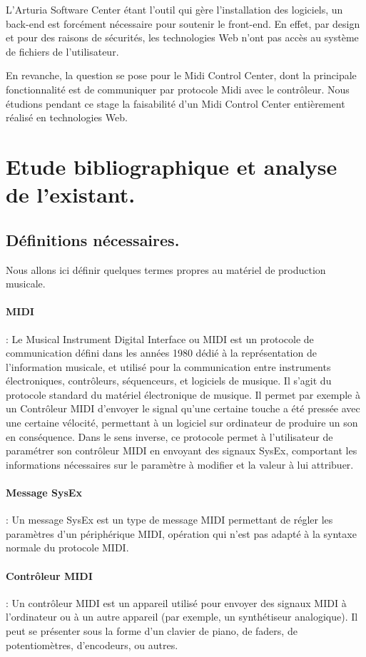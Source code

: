 \documentclass[francais]{rapportPFE}  %
\begin{document}
L'Arturia Software Center étant l'outil qui gère l'installation des logiciels, un back-end est forcément nécessaire pour soutenir le front-end. En effet, par design et pour des raisons de sécurités, les technologies Web n'ont pas accès au système de fichiers de l'utilisateur.

En revanche, la question se pose pour le Midi Control Center, dont la principale fonctionnalité est de communiquer par protocole Midi avec le contrôleur. Nous étudions pendant ce stage la faisabilité d'un Midi Control Center entièrement réalisé en technologies Web.

\section{Etude bibliographique et analyse de l'existant.}


\subsection{Définitions nécessaires.}

Nous allons ici définir quelques termes propres au matériel de production musicale.
\paragraph{MIDI} \cite{midi}
: Le Musical Instrument Digital Interface ou MIDI est un protocole de communication défini dans les années 1980 dédié à la représentation de l'information musicale, et utilisé pour la communication entre instruments électroniques, contrôleurs, séquenceurs, et logiciels de musique. Il s'agit du protocole standard du matériel électronique de musique. Il permet par exemple à un Contrôleur MIDI d'envoyer le signal qu'une certaine touche a été pressée avec une certaine vélocité, permettant à un logiciel sur ordinateur de produire un son en conséquence. Dans le sens inverse, ce protocole permet à l'utilisateur de paramétrer son contrôleur MIDI en envoyant des signaux SysEx, comportant les informations nécessaires sur le paramètre à modifier et la valeur à lui attribuer.
\paragraph{Message SysEx} \cite{sysex}
: Un message SysEx est un type de message MIDI permettant de régler les paramètres d'un périphérique MIDI, opération qui n'est pas adapté à la syntaxe normale du protocole MIDI. 
\paragraph{Contrôleur MIDI}  \cite{controller}
:  Un contrôleur MIDI est un appareil utilisé pour envoyer des signaux MIDI à l'ordinateur ou à un autre appareil (par exemple, un synthétiseur analogique). Il peut se présenter sous la forme d'un clavier de piano, de faders, de potentiomètres, d'encodeurs, ou autres.
\end{document}
